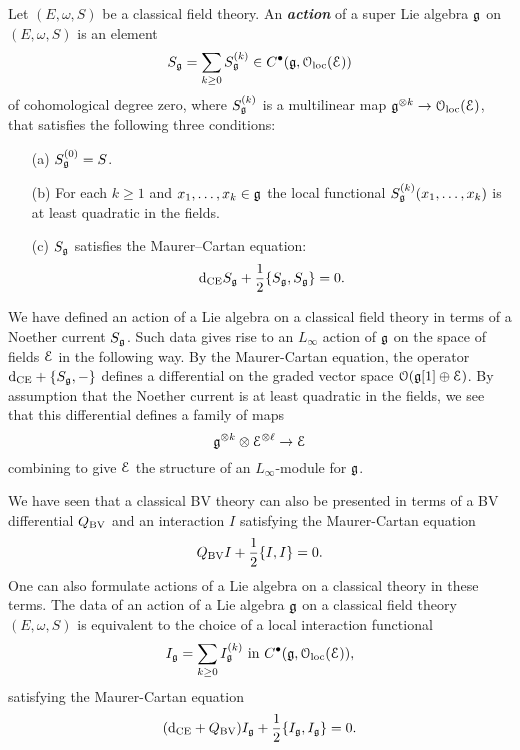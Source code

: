\documentclass[10pt, oneside]{article}
\newcommand{\defterm}[1]{\textbf{\emph{#1}}}
\begin{document}
\begin{definition}
\label{infinitesimal_action_def}
Let $(E, \omega, S)$ be a classical field theory. An \defterm{action} of a super Lie algebra $\mathfrak g$ on $(E, \omega, S)$ is an element 
\[S_\mathfrak g = \sum_{k\geq 0} S_{\mathfrak g}^{(k)}\in C^\bullet(\mathfrak g, \mathcal{O}_{\rm loc}(\mathcal E))\]
of cohomological degree zero, where $S_\mathfrak g^{(k)}$ is a multilinear map $\mathfrak g^{\otimes k} \to \mathcal{O}_{\rm loc}(\mathcal E)$, that satisfies the following three conditions:
\begin{itemize}
\item[(a)] $S_\mathfrak g^{(0)} = S$.
\item[(b)] For each $k \geq 1$ and $x_1, \ldots, x_k \in \mathfrak g$ the local functional $S^{(k)}_\mathfrak g (x_1,\ldots, x_k)$ is at least quadratic in the fields.
\item[(c)] $S_\mathfrak g$ satisfies the Maurer--Cartan equation:
\[{\rm d}_{\mathrm{CE}} S_\mathfrak g + \frac{1}{2} \{S_\mathfrak g, S_\mathfrak g\} = 0.\]
\end{itemize}
\end{definition}

\begin{remark}
We have defined an action of a Lie algebra on a classical field theory in terms of a Noether current $S_\mathfrak g$.
Such data gives rise to an $L_\infty$ action of $\mathfrak g$ on the space of fields $\mathcal E$ in the following way.
By the Maurer-Cartan equation, the operator ${\rm d}_{\mathrm{CE}} + \{S_\mathfrak g, -\}$ 
defines a differential on the graded vector space $\mathcal O(\mathfrak g[1] \oplus \mathcal E)$. 
By assumption that the Noether current is at least quadratic in the fields, we see that this differential defines a family of maps
\[
\mathfrak g^{\otimes k} \otimes \mathcal E^{\otimes \ell} \to \mathcal E
\]
combining to give $\mathcal E$ the structure of an $L_\infty$-module for $\mathfrak g$.
\end{remark}

\begin{remark}
We have seen that a classical BV theory can also be presented in terms of a BV differential $Q_{\mathrm{BV}}$ and an interaction $I$ satisfying the Maurer-Cartan equation
\[Q_{\mathrm{BV}} I + \frac{1}{2} \{I,I\} = 0 .\]
One can also formulate actions of a Lie algebra on a classical theory in these terms. 
The data of an action of a Lie algebra $\mathfrak g$ on a classical field theory $(E, \omega, S)$ is equivalent to the choice of a local interaction functional 
\[I_\mathfrak g = \sum_{k\geq 0} I_{\mathfrak g}^{(k)} \text{ in } C^\bullet(\mathfrak g, \mathcal{O}_{\rm loc}(\mathcal E)),\]
satisfying the Maurer-Cartan equation
\[({\rm d}_{\mathrm{CE}} + Q_{\mathrm{BV}}) I_\mathfrak g + \frac{1}{2} \{I_\mathfrak g, I_\mathfrak g\} = 0.\]
\end{remark}
\end{document}

